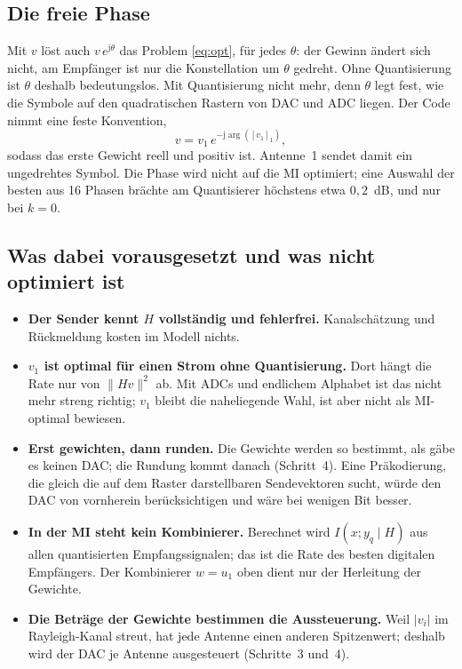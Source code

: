 \documentclass[11pt,a4paper]{article}
\begin{document}
\subsection{Die freie Phase}

Mit $v$ löst auch $v\,e^{\mathrm j\theta}$ das Problem \eqref{eq:opt}, für jedes $\theta$: der
Gewinn ändert sich nicht, am Empfänger ist nur die Konstellation um $\theta$ gedreht. Ohne
Quantisierung ist $\theta$ deshalb bedeutungslos. Mit Quantisierung nicht mehr, denn $\theta$
legt fest, wie die Symbole auf den quadratischen Rastern von DAC und ADC liegen. Der Code nimmt
eine feste Konvention,
\begin{equation}
v=v_1\,e^{-\mathrm j\arg([v_1]_1)},
\end{equation}
sodass das erste Gewicht reell und positiv ist. Antenne~1 sendet damit ein ungedrehtes Symbol.
Die Phase wird nicht auf die MI optimiert; eine Auswahl der besten aus 16 Phasen brächte am
Quantisierer höchstens etwa $0{,}2$~dB, und nur bei $k=0$.

\subsection{Was dabei vorausgesetzt und was nicht optimiert ist}

\begin{itemize}[leftmargin=1.4em,itemsep=0.2em,topsep=0.2em]
\item \textbf{Der Sender kennt $H$ vollständig und fehlerfrei.} Kanalschätzung und Rückmeldung
kosten im Modell nichts.
\item \textbf{$v_1$ ist optimal für einen Strom ohne Quantisierung.} Dort hängt die Rate nur von
$\|Hv\|^2$ ab. Mit ADCs und endlichem Alphabet ist das nicht mehr streng richtig; $v_1$ bleibt die
naheliegende Wahl, ist aber nicht als MI-optimal bewiesen.
\item \textbf{Erst gewichten, dann runden.} Die Gewichte werden so bestimmt, als gäbe es keinen DAC;
die Rundung kommt danach (Schritt~4). Eine Präkodierung, die gleich die auf dem Raster
darstellbaren Sendevektoren sucht, würde den DAC von vornherein berücksichtigen und wäre bei
wenigen Bit besser.
\item \textbf{In der MI steht kein Kombinierer.} Berechnet wird $I(x;y_q\mid H)$ aus allen
quantisierten Empfangssignalen; das ist die Rate des besten digitalen Empfängers. Der Kombinierer
$w=u_1$ oben dient nur der Herleitung der Gewichte.
\item \textbf{Die Beträge der Gewichte bestimmen die Aussteuerung.} Weil $|v_i|$ im Rayleigh-Kanal
streut, hat jede Antenne einen anderen Spitzenwert; deshalb wird der DAC je Antenne ausgesteuert
(Schritte~3 und~4).
\end{itemize}
\end{document}
